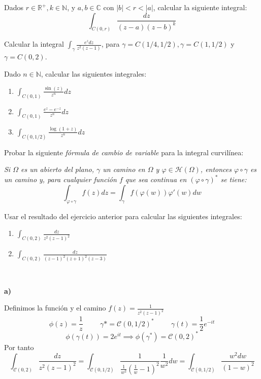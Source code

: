\begin{ejer}
	Dados $r\in\mathbb{R}^+,k\in\mathbb{N}$, y $a,b\in\mathbb{C}$ con $|b|<r<|a|$, calcular la siguiente integral:
	$$ \int_{C(0,r)}\frac{dz}{(z-a)(z-b)^k} $$
\end{ejer}

\begin{ejer}
	Calcular la integral $\int_{\gamma}\frac{e^zdz}{z^2(z-1)}$, para $\gamma=C(1/4,1/2), \gamma=C(1,1/2)$ y $\gamma=C(0,2)$.
\end{ejer}

\begin{ejer}
	Dado $n\in\mathbb{N}$, calcular las siguientes integrales:
	\begin{enumerate}[label=(\alph*)]
		\item $\int_{C(0,1)}\frac{\sin(z)}{z^n}dz$
		\item $\int_{C(0,1)}\frac{e^z-e^{-z}}{z^n}dz$
		\item $\int_{C(0,1/2)}\frac{\log(1+z)}{z^n}dz$
	\end{enumerate}
\end{ejer}

\begin{ejer}
	Probar la siguiente \textit{fórmula de cambio de variable} para la integral curvilínea:
	
	\textit{Si $\Omega$ es un abierto del plano, $\gamma$ un camino en $\Omega$ y $\varphi\in\mathcal{H}(\Omega)$, entonces $\varphi\circ\gamma$ es un camino y, para cualquier función $f$ que sea continua en $(\varphi\circ\gamma)^{\ast}$ se tiene:}
	$$ \int_{\varphi\circ\gamma} f(z)dz = \int_{\gamma}f(\varphi(w))\varphi'(w)dw $$
\end{ejer}

\begin{ejer}
	Usar el resultado del ejercicio anterior para calcular las siguientes integrales:
	\begin{enumerate}[label=(\alph*)]
		\item $\int_{C(0,2)}\frac{dz}{z^2(z-1)^2}$
		\item $\int_{C(0,2)}\frac{dz}{(z-1)^2(z+1)^2(z-3)}$
	\end{enumerate}
\end{ejer}

\begin{sol}
	
	\
	
	\textbf{a)}
	
	Definimos la función y el camino
	$f(z) = \frac{1}{z^2(z-1)^2}$
	$$ \phi(z) = \frac{1}{z} \hspace{1cm} \gamma{\ast} = \mathcal{C}(0,1/2)^{\ast} \hspace{1cm} \gamma(t) = \frac{1}{2}e^{-it} $$
	$$ \phi(\gamma(t)) = 2e^{it}\implies \phi(\gamma^{\ast}) = \mathcal{C}(0,2)^{\ast}$$
	Por tanto
	$$\int_{\mathcal{C}(0,2)} \frac{dz}{z^2(z-1)^2} = \int_{\mathcal{C}(0,1/2)} \frac{1}{ \frac{1}{w^2} (\frac{1}{w}-1)^2} \frac{1}{w^2} dw = \int_{\mathcal{C}(0,1/2)} \frac{w^2dw}{(1-w)^2}$$
\end{sol}

